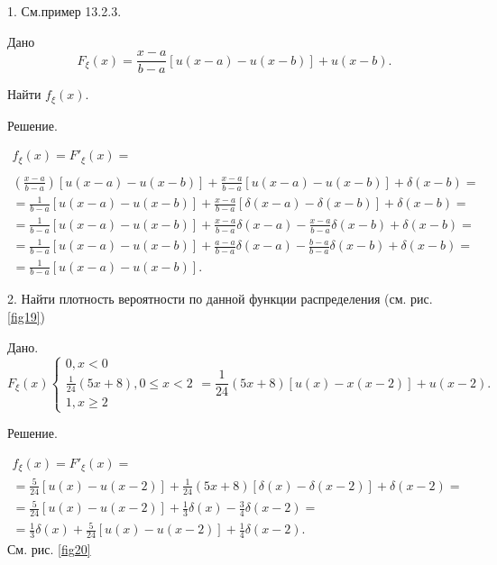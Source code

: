 \begin{example}
\label{ex:13.6}
	1. См.пример 13.2.3. 

	Дано
	\begin{equation*}
		F_{\xi}(x)=\frac{x-a}{b-a}[u(x-a)-u(x-b)]+u(x-b).
	\end{equation*}

	Найти $f_{\xi}(x)$.

	Решение.

	\begin{gather*}
		f_{\xi}(x)=F'_{\xi}(x)=\\
		\\\left(\frac{x-a}{b-a}\right)[u(x-a)-u(x-b)]+\frac{x-a}{b-a}
		[u(x-a)-u(x-b)]+\delta(x-b)=\\
		=\frac{1}{b-a}[u(x-a)-u(x-b)]+\frac{x-a}{b-a}[\delta(x-a)-\delta(x-b)]+\delta(x-b)=
	\end{gather*}
	\begin{gather*}
		=\frac{1}{b-a}[u(x-a)-u(x-b)]+\frac{x-a}{b-a}\delta(x-a)
		-\frac{x-a}{b-a}\delta(x-b)+\delta(x-b)=\\=
		\frac{1}{b-a}[u(x-a)-u(x-b)]+\frac{a-a}{b-a}\delta(x-a)-\frac{b-a}{b-a}\delta(x-b)+\delta(x-b)=\\=\frac{1}{b-a}[u(x-a)-u(x-b)].
	\end{gather*}

	2. Найти плотность вероятности по данной функции распределения
	(см. рис. \ref{fig19})
	
	Дано.
	\begin{equation*}
		F_{\xi}(x)
		\begin{cases}
			0, x<0 \\
			\frac{1}{24}(5x+8), 0\leqslant x<2 \\
			1, x\geqslant 2
		\end{cases}
		=\frac{1}{24}(5x+8)[u(x)-x(x-2)]+u(x-2).
	\end{equation*}

	Решение.

	\begin{gather*}
		f_{\xi}(x)=F'_{\xi}(x)=\\=
		\frac{5}{24}[u(x)-u(x-2)]+\frac{1}{24}(5x+8)[\delta(x)-\delta(x-2)]+\delta(x-2)=\\=
		\frac{5}{24}[u(x)-u(x-2)]+\frac{1}{3}\delta(x)-\frac{3}{4}\delta(x-2)=\\=
		\frac{1}{3}\delta(x)+\frac{5}{24}[u(x)-u(x-2)]+\frac{1}{4}\delta(x-2).
	\end{gather*}
	См. рис. \ref{fig20}
\end{example}
